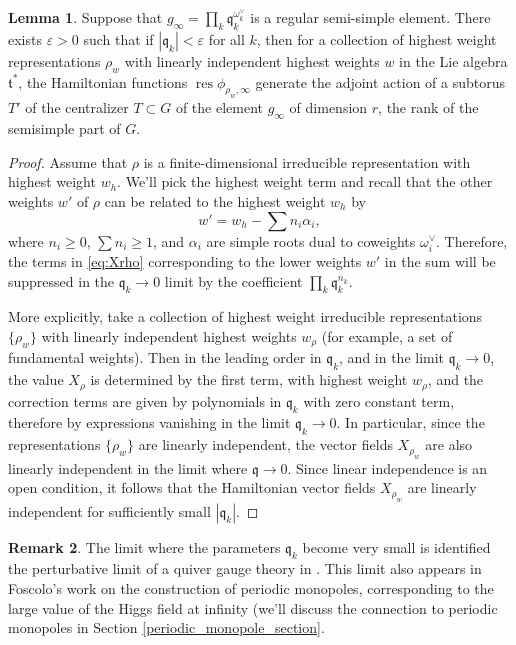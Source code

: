 \documentclass[11pt, oneside, reqno]{amsart}
\theoremstyle{definition} \newtheorem{definition}{Definition}[section]
\newtheorem{lemma}[definition]{Lemma}
\theoremstyle{definition} \newtheorem{remark}[definition]{Remark}
\theoremstyle{definition} \newtheorem{remarks}[definition]{Remarks}
\theoremstyle{definition} \newtheorem{question}[definition]{Question}
\theoremstyle{definition} \newtheorem*{note}{Note}
\theoremstyle{definition} \newtheorem{example}[definition]{Example}
\theoremstyle{definition} \newtheorem{examples}[definition]{Examples}
\newcommand{\qq}{\mathfrak{q}}
\newcommand{\mf}[1]{\mathfrak{#1}}
\newcommand{\eps}{\varepsilon}
\DeclareMathOperator{\res}{res}
\begin{document}
\begin{lemma}\label{lemma:smallq}
  Suppose that $g_\infty = \prod_{k} \qq_k ^{\omega_k^{\vee}}$ is a regular semi-simple element.  There exists $\eps > 0$ such that if $|\qq_k| < \eps$ for all $k$, then for a collection of highest weight representations $\rho_w$ with linearly independent highest weights $w$ in the Lie algebra $\mf t^*$, the Hamiltonian functions $\res \phi_{\rho_w, \infty}$ generate the adjoint action of a subtorus $T'$ of the centralizer $T \subset G$ of the element $g_\infty$ of dimension $r$, the rank of the semisimple part of $G$. 
\end{lemma}  

\begin{proof}
Assume that $\rho$ is a finite-dimensional irreducible representation with highest weight $w_h$.
  We'll pick the highest weight term and recall that the other weights $w'$ of $\rho$ can be related to the highest weight $w_{h}$ by 
  \[w' = w_{h} - \sum {n_i \alpha_i},\]
  where $n_i \geq 0$,  $\sum n_i \geq 1$, and $\alpha_i$ are simple roots dual to coweights $\omega_i^{\vee}$.
  Therefore, the terms in \ref{eq:Xrho} corresponding to the lower weights $w'$ in the sum will be suppressed in the $\qq_k \to 0$ limit by the coefficient $\prod_{k} \qq_k^{n_k}$.
  
  More explicitly, take a collection of highest weight irreducible representations $\{\rho_{w}\}$ with linearly independent highest weights $w_{\rho}$ (for example, a set of fundamental weights). Then in the leading order in $\qq_k$, and in the limit $\qq_k \to 0$, the value $X_{\rho}$ is determined by the first term, with highest weight $w_{\rho}$, and the correction terms are given by polynomials in $\qq_k$ with zero constant term, therefore by expressions vanishing in the limit $\qq_k \to 0$. In particular, since the representations $\{\rho_w\}$ are linearly independent, the vector fields $X_{\rho_{w}}$ are also linearly independent in the limit where $\qq \to 0$.  Since linear independence is an open condition, it follows that the Hamiltonian vector fields $X_{\rho_w}$ are linearly independent for sufficiently small $|\qq_k|$.
\end{proof}

\begin{remark}
  The limit where the parameters $\qq_k$ become very small is identified the perturbative limit of a quiver gauge theory in \cite{NekrasovPestun}.  This limit also appears in Foscolo's work \cite{FoscoloGluing} on the construction of periodic monopoles, corresponding to the large value of the Higgs field at infinity (we'll discuss the connection to periodic monopoles in Section \ref{periodic_monopole_section}. 
\end{remark}
\end{document}
